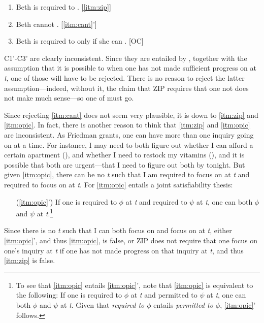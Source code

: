 \documentclass[12pt]{article}
\begin{document}
\begin{enumerate}[label=(C\arabic*'),ref=C\arabic*]
    \item Beth is required to \foc{}. [\ref*{itm:zip}]
    \item Beth cannot \foc{}. [\ref*{itm:cant}']
    \item Beth is required to \foc{} only if she can \foc{}. [OC]
\end{enumerate}
%
C1'-C3' are clearly inconsistent. Since they are entailed by \psub{}, together with the assumption that it is possible to \jud{} when one has not made sufficient progress on  at \textit{t}, one of those will have to be rejected. There is no reason to reject the latter assumption---indeed, without it, the claim that ZIP requires that one not \jud{} does not make much sense---so one of \psub{} must go.

Since rejecting \ref*{itm:cant} does not seem very plausible, it is down to \ref*{itm:zip} and \ref*{itm:opic}. In fact, there is another reason to think that \ref*{itm:zip} and \ref*{itm:opic} are inconsistent. As Friedman grants, one can have more than one inquiry going on at a time. For instance, I may need to both figure out whether I can afford a certain apartment (), and whether I need to restock my vitamins (), and it is possible that both are urgent---that I need to figure out both by tonight. But given \ref*{itm:opic}, there can be no \textit{t} such that I am required to focus on  at \textit{t} and required to focus on  at \textit{t}. For \ref*{itm:opic} entails a joint satisfiability thesis:

\begin{enumerate}
    \item[(\ref*{itm:opic}')] If one is required to $\phi$ at \textit{t} and required to $\psi$ at \textit{t}, one can both $\phi$ and $\psi$ at \textit{t}.\footnote{To see that \ref*{itm:opic} entails \ref*{itm:opic}', note that \ref*{itm:opic} is equivalent to the following: If one is required to $\phi$ at \textit{t} and permitted to $\psi$ at \textit{t}, one can both $\phi$ and $\psi$ at \textit{t}. Given that \textit{required to $\phi$} entails \textit{permitted to $\phi$}, \ref*{itm:opic}' follows.}
\end{enumerate}
%
Since there is no \textit{t} such that I can both focus on  and focus on  at \textit{t}, either \ref*{itm:opic}', and thus \ref*{itm:opic}, is false, or ZIP does not require that one focus on one's inquiry at \textit{t} if one has not made progress on that inquiry at \textit{t}, and thus \ref*{itm:zip} is false.
\end{document}
